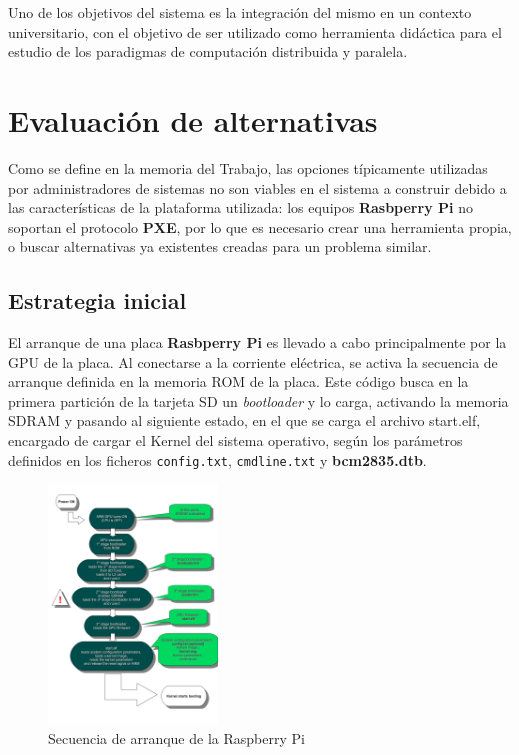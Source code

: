 \documentclass{article}
\begin{document}
Uno de los objetivos del sistema es la integración del mismo en un contexto universitario, con el objetivo de ser utilizado como herramienta didáctica para el estudio de los paradigmas de computación distribuida y paralela.

\section{Evaluación de alternativas}

Como se define en la memoria del Trabajo, las opciones típicamente utilizadas por administradores de sistemas no son viables en el sistema a construir debido a las características de la plataforma utilizada: los equipos \textbf{Rasbperry Pi} no soportan el protocolo \textbf{PXE}, por lo que es necesario crear una herramienta propia, o buscar alternativas ya existentes creadas para un problema similar.

\subsection{Estrategia inicial}

El arranque de una placa \textbf{Rasbperry Pi} es llevado a cabo principalmente por la GPU de la placa. Al conectarse a la corriente eléctrica, se activa la secuencia de arranque definida en la memoria ROM de la placa. Este código busca en la primera partición de la tarjeta SD un \textit{bootloader} y lo carga, activando la memoria SDRAM y pasando al siguiente estado, en el que se carga el archivo start.elf, encargado de cargar el Kernel del sistema operativo, según los parámetros definidos en los ficheros \texttt{config.txt}, \texttt{cmdline.txt} y \textbf{bcm2835.dtb}.

\begin{figure}[H]
	\centering
	\includegraphics[width=0.4\textwidth]{bootsequence}
	\caption{Secuencia de arranque de la Raspberry Pi\cite{bootsequence}}
	\label{bootsequence}
\end{figure}
\end{document}

